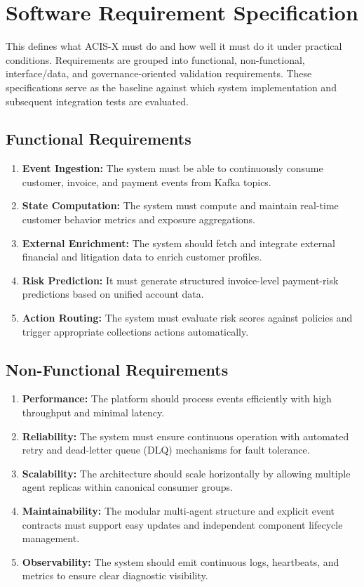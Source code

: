 \documentclass[a4paper, 12pt]{report}
\begin{document}
\section{Software Requirement Specification}
This defines what ACIS-X must do and how well it must do it under practical conditions. Requirements are grouped into functional, non-functional, interface/data, and governance-oriented validation requirements. These specifications serve as the baseline against which system implementation and subsequent integration tests are evaluated.

\subsection{Functional Requirements}
\begin{enumerate}[label=\textbf{\roman*.}, itemsep=\parskip, parsep=0pt]
    \item \textbf{Event Ingestion:} The system must be able to continuously consume customer, invoice, and payment events from Kafka topics.
    \item \textbf{State Computation:} The system must compute and maintain real-time customer behavior metrics and exposure aggregations.
    \item \textbf{External Enrichment:} The system should fetch and integrate external financial and litigation data to enrich customer profiles.
    \item \textbf{Risk Prediction:} It must generate structured invoice-level payment-risk predictions based on unified account data.
    \item \textbf{Action Routing:} The system must evaluate risk scores against policies and trigger appropriate collections actions automatically.
\end{enumerate}

\subsection{Non-Functional Requirements}
\begin{enumerate}[label=\textbf{\roman*.}, itemsep=\parskip, parsep=0pt]
    \item \textbf{Performance:} The platform should process events efficiently with high throughput and minimal latency.
    \item \textbf{Reliability:} The system must ensure continuous operation with automated retry and dead-letter queue (DLQ) mechanisms for fault tolerance.
    \item \textbf{Scalability:} The architecture should scale horizontally by allowing multiple agent replicas within canonical consumer groups.
    \item \textbf{Maintainability:} The modular multi-agent structure and explicit event contracts must support easy updates and independent component lifecycle management.
    \item \textbf{Observability:} The system should emit continuous logs, heartbeats, and metrics to ensure clear diagnostic visibility.
\end{enumerate}
\end{document}
